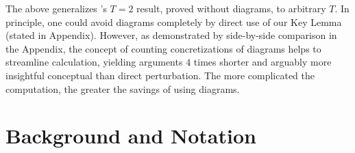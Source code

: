 \documentclass{article}
\theoremstyle{plain}
\theoremstyle{definition}
\newtheorem{exm}{Example}
\newcommand{\expct}[1]{\mathbb{E}\left[#1\right]}
\newcommand{\sizeddia}[2]{
    \begin{gathered}
        \texttt{[image: ../diagrams/\#1.png]}
    \end{gathered}
}
\newcommand{\sdia}[1]{\protect \sizeddia{#1}{0.10}}
\begin{document}
        The above generalizes \citet{ro18}'s $T=2$ result, proved without
        diagrams, to arbitrary $T$.  In principle, one could avoid diagrams
        completely by direct use of our Key Lemma (stated in Appendix).
        However, as demonstrated by side-by-side comparison in the Appendix,
        the concept of counting concretizations of diagrams helps to streamline
        calculation, yielding arguments $4$ times shorter and arguably more
        insightful conceptual than direct perturbation.  The more complicated
        the computation, the greater the savings of using diagrams.





\section{Background and Notation} \label{sect:background}
\end{document}
